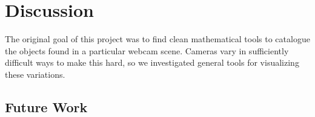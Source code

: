 \chapter{Discussion}
\label{cpt:discussion}

The original goal of this project was to find clean mathematical tools to catalogue
the objects found in a particular webcam scene.  Cameras vary in sufficiently difficult
ways to make this hard, so we investigated general tools for visualizing these variations.

\section{Future Work}

